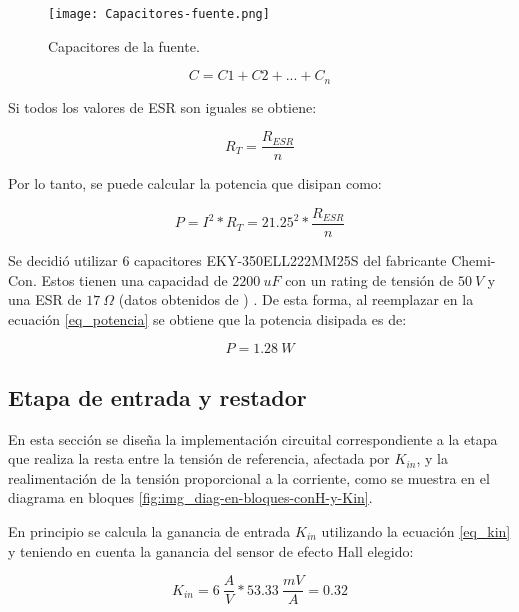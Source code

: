 \begin{figure}[H]
	\centering
	\texttt{[image: Capacitores-fuente.png]}
	\caption{Capacitores de la fuente.}
	\label{fig:img_capacitores-fuente}
\end{figure}


\begin{equation} 
	C = C1 + C2 + ... + C_n
\end{equation}


\noindent Si todos los valores de ESR son iguales se obtiene:

\begin{equation} 
	R_T = \frac{R_{ESR}}{n}
\end{equation}

\noindent Por lo tanto, se puede calcular la potencia que disipan como:

\begin{equation}\label{eq_potencia} 
	P = I^2 * R_T = 21.25^2 * \frac{R_{ESR}}{n}
\end{equation}

\noindent Se decidió utilizar 6 capacitores  EKY-350ELL222MM25S del fabricante Chemi-Con. Estos tienen una capacidad de $2200 \:uF$ con un rating de tensión de $50\:V$ y una ESR de $17 \:\Omega$ (datos obtenidos de \cite{EKY-350ELL222MM25S}) . De esta forma, al reemplazar en la ecuación \ref{eq_potencia} se obtiene que la potencia disipada es de: 

\begin{equation} 
	P=1.28\:W
\end{equation}

\subsection{Etapa de entrada y restador}

En esta sección se diseña la implementación circuital correspondiente a la etapa que realiza la resta entre la tensión de referencia, afectada por $K_{in}$, y la realimentación de la tensión proporcional a la corriente, como se muestra en el diagrama en bloques \ref{fig:img_diag-en-bloques-conH-y-Kin}.



En principio se calcula la ganancia de entrada $K_{in}$ utilizando la ecuación \ref{eq_kin} y teniendo en cuenta la ganancia del sensor de efecto Hall elegido:

\begin{equation}
	K_{in}=6\:\frac{A}{V}*53.33\:\frac{mV}{A}=0.32
\end{equation}

